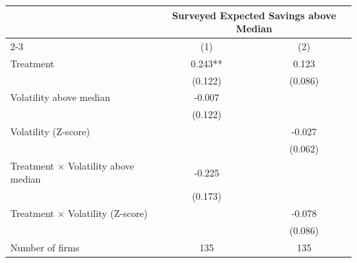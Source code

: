 \begin{tabular}[t]{lcc}
\toprule
  & \multicolumn{2}{c}{Surveyed Expected Savings above Median} \\
  \cmidrule(lr){2-3} 
  & (1) & (2) \\
\midrule
Treatment & 0.243** & 0.123\\
 & (0.122) & (0.086)\\
Volatility above median & -0.007 & \\
 & (0.122) & \\
Volatility (Z-score) &  & -0.027\\
 &  & (0.062)\\
Treatment × Volatility above median & -0.225 & \\
 & (0.173) & \\
Treatment × Volatility (Z-score) &  & -0.078\\
 &  & (0.086)\\
\midrule
Number of firms & 135 & 135\\
\bottomrule
\end{tabular}
